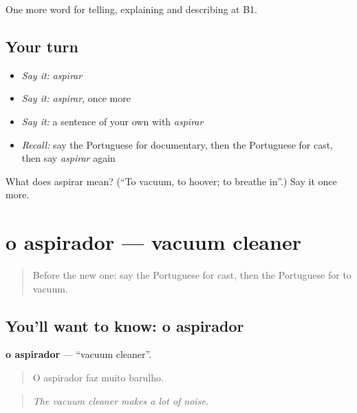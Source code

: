 \begin{grammarlens}[title={What you've built}]
One more word for telling, explaining and describing at B1.
\end{grammarlens}

\subsection*{Your turn}
\begin{itemize}
\raggedright
  \item \emph{Say it:} \emph{aspirar}
  \item \emph{Say it:} \emph{aspirar}, once more
  \item \emph{Say it:} a sentence of your own with \emph{aspirar}
  \item \emph{Recall:} say the Portuguese for documentary, then the Portuguese for cast, then say \emph{aspirar} again
\end{itemize}

\begin{tcolorbox}[breakable,colback=teal!4,colframe=teal!35!black,title={Before you move on}]
What does aspirar mean? (\textquotedblleft{}To vacuum, to hoover; to breathe in\textquotedblright{}.) Say it once more.
\end{tcolorbox}
\section[o aspirador]{o aspirador — vacuum cleaner}

\label{lesson:PT-C528-aspirador}



\begin{quote}
Before the new one: say the Portuguese for cast, then the Portuguese for to vacuum.
\end{quote}

\subsection*{You'll want to know: o aspirador}
\textbf{o aspirador} — \textquotedblleft{}vacuum cleaner\textquotedblright{}.

\begin{quote}
O aspirador faz muito barulho.
\end{quote}

\begin{quote}
\emph{The vacuum cleaner makes a lot of noise.}
\end{quote}

